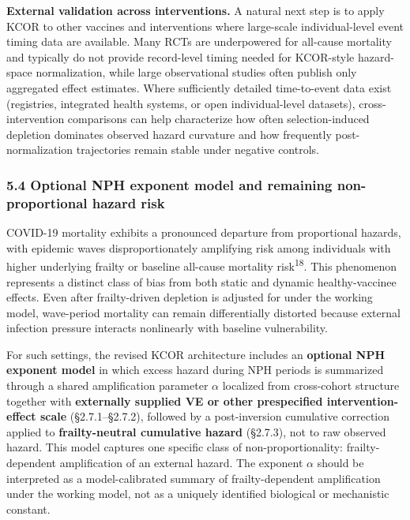 \documentclass[
]{article}
\begin{document}
\textbf{External validation across interventions.} A natural next step is to apply KCOR to other vaccines and interventions where large-scale individual-level event timing data are available. Many RCTs are underpowered for all-cause mortality and typically do not provide record-level timing needed for KCOR-style hazard-space normalization, while large observational studies often publish only aggregated effect estimates. Where sufficiently detailed time-to-event data exist (registries, integrated health systems, or open individual-level datasets), cross-intervention comparisons can help characterize how often selection-induced depletion dominates observed hazard curvature and how frequently post-normalization trajectories remain stable under negative controls.

\subsubsection{5.4 Optional NPH exponent model and remaining non-proportional hazard risk}\label{optional-nph-exponent-model-and-remaining-non-proportional-hazard-risk}

COVID-19 mortality exhibits a pronounced departure from proportional hazards, with epidemic waves disproportionately amplifying risk among individuals with higher underlying frailty or baseline all-cause mortality risk\textsuperscript{18}. This phenomenon represents a distinct class of bias from both static and dynamic healthy-vaccinee effects. Even after frailty-driven depletion is adjusted for under the working model, wave-period mortality can remain differentially distorted because external infection pressure interacts nonlinearly with baseline vulnerability.

For such settings, the revised KCOR architecture includes an \textbf{optional NPH exponent model} in which excess hazard during NPH periods is summarized through a shared amplification parameter \(\alpha\) localized from cross-cohort structure together with \textbf{externally supplied VE or other prespecified intervention-effect scale} (§2.7.1--§2.7.2), followed by a post-inversion cumulative correction applied to \textbf{frailty-neutral cumulative hazard} (§2.7.3), not to raw observed hazard. This model captures one specific class of non-proportionality: frailty-dependent amplification of an external hazard. The exponent \(\alpha\) should be interpreted as a model-calibrated summary of frailty-dependent amplification under the working model, not as a uniquely identified biological or mechanistic constant.
\end{document}
